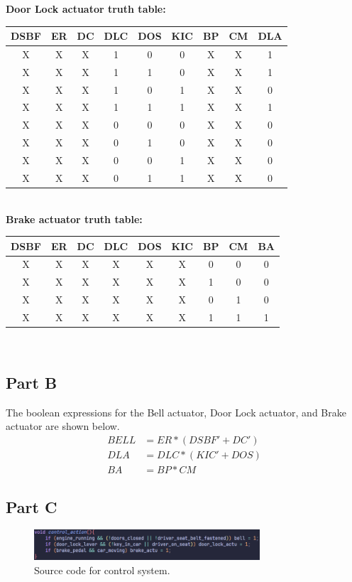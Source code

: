\documentclass{article}
\begin{document}
\noindent\textbf{Door Lock actuator truth table:}
\\
\begin{tabular} {c c c c c c c c | c}
    \hline
    DSBF & ER & DC & DLC & DOS & KIC & BP & CM & DLA \\
    \hline
    X & X & X & 1 & 0 & 0 & X & X & 1 \\
    X & X & X & 1 & 1 & 0 & X & X & 1 \\
    X & X & X & 1 & 0 & 1 & X & X & 0 \\
    X & X & X & 1 & 1 & 1 & X & X & 1 \\
    X & X & X & 0 & 0 & 0 & X & X & 0 \\
    X & X & X & 0 & 1 & 0 & X & X & 0 \\
    X & X & X & 0 & 0 & 1 & X & X & 0 \\
    X & X & X & 0 & 1 & 1 & X & X & 0 \\
\end{tabular}
\\

\noindent\textbf{Brake actuator truth table:}
\\
\begin{tabular} {c c c c c c c c | c}
    \hline
    DSBF & ER & DC & DLC & DOS & KIC & BP & CM & BA \\
    \hline
    X & X & X & X & X & X & 0 & 0 & 0 \\
    X & X & X & X & X & X & 1 & 0 & 0 \\
    X & X & X & X & X & X & 0 & 1 & 0 \\
    X & X & X & X & X & X & 1 & 1 & 1 \\
\end{tabular}
\\

\subsection{Part B}
The boolean expressions for the Bell actuator, Door Lock actuator, and Brake actuator are shown below.
\begin{align*}
    BELL &= ER * (DSBF' + DC') \\
    DLA &= DLC * (KIC' + DOS) \\
    BA &= BP * CM
\end{align*}

\subsection{Part C}
\begin{figure}[H]
    \centering
    \includegraphics[width=0.75\textwidth]{./images/prob3partc.png}
    \caption{Source code for control system.}
\end{figure}
\end{document}
